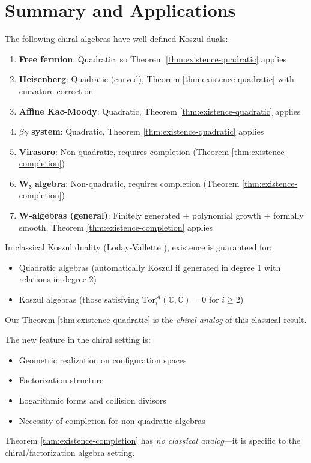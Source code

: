 \section{Summary and Applications}

\begin{corollary}
\label{cor:existence-examples}
The following chiral algebras have well-defined Koszul duals:

\begin{enumerate}
\item \textbf{Free fermion}: Quadratic, so Theorem \ref{thm:existence-quadratic} applies
\item \textbf{Heisenberg}: Quadratic (curved), Theorem \ref{thm:existence-quadratic} with curvature correction
\item \textbf{Affine Kac-Moody}: Quadratic, Theorem \ref{thm:existence-quadratic} applies
\item \textbf{$\beta\gamma$ system}: Quadratic, Theorem \ref{thm:existence-quadratic} applies
\item \textbf{Virasoro}: Non-quadratic, requires completion (Theorem \ref{thm:existence-completion})
\item \textbf{W₃ algebra}: Non-quadratic, requires completion (Theorem \ref{thm:existence-completion})
\item \textbf{W-algebras (general)}: Finitely generated + polynomial growth + formally smooth, Theorem \ref{thm:existence-completion} applies
\end{enumerate}
\end{corollary}

\begin{remark}
\label{rem:classical-comparison}
In classical Koszul duality (Loday-Vallette \cite{LV12}), existence is guaranteed for:
\begin{itemize}
\item Quadratic algebras (automatically Koszul if generated in degree 1 with relations in degree 2)
\item Koszul algebras (those satisfying $\text{Tor}_i^{\mathcal{A}}(\mathbb{C}, \mathbb{C}) = 0$ for $i \geq 2$)
\end{itemize}

Our Theorem \ref{thm:existence-quadratic} is the \textit{chiral analog} of this classical result.

The new feature in the chiral setting is:
\begin{itemize}
\item Geometric realization on configuration spaces
\item Factorization structure
\item Logarithmic forms and collision divisors
\item Necessity of completion for non-quadratic algebras
\end{itemize}

Theorem \ref{thm:existence-completion} has \textit{no classical analog}---it is specific to the chiral/factorization algebra setting.
\end{remark}

